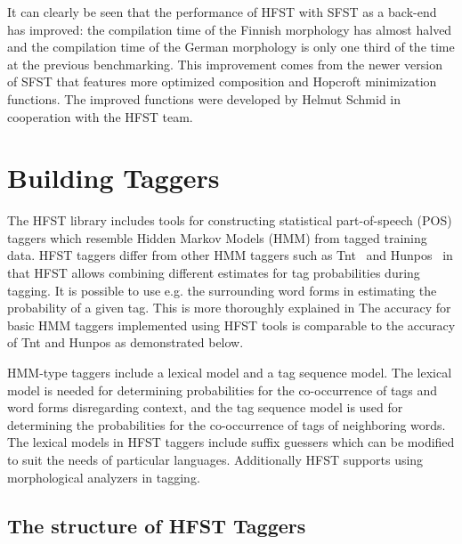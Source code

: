 \documentclass{llncs}
\begin{document}
It can clearly be seen that the performance of HFST with SFST as a back-end 
has improved: the compilation time of the Finnish morphology has almost
halved and the compilation time of the German morphology is only one third of the
time at the previous benchmarking. 
This improvement comes from the newer version of SFST that features more optimized
composition and Hopcroft minimization functions. The improved functions 
were developed by Helmut Schmid in cooperation with the HFST team.



\section{Building Taggers}\label{PosTools}



The HFST library includes tools for constructing statistical
part-of-speech (POS) taggers which resemble Hidden Markov Models (HMM) from
tagged training data. HFST taggers differ from other HMM taggers such
as Tnt~\cite{Brants:2000} and Hunpos~\cite{Halascy:2007} in that HFST
allows combining different estimates for tag probabilities during
tagging. It is possible to use e.g. the surrounding word forms in
estimating the probability of a given tag. This is more thoroughly
explained in \cite{silfverberg/2010/icetal,silfverberg/2011/nodalida} The
accuracy for basic HMM taggers implemented using HFST tools is
comparable to the accuracy of Tnt and Hunpos as demonstrated below.

HMM-type taggers include a lexical model and a tag sequence model. The
lexical model is needed for determining probabilities for the
co-occurrence of tags and word forms disregarding context, and the tag
sequence model is used for determining the probabilities for the
co-occurrence of tags of neighboring words. The lexical models in
HFST taggers include suffix guessers which can be modified to suit
the needs of particular languages. Additionally HFST supports using
morphological analyzers in tagging.

\subsection{The structure of HFST Taggers}
\end{document}
